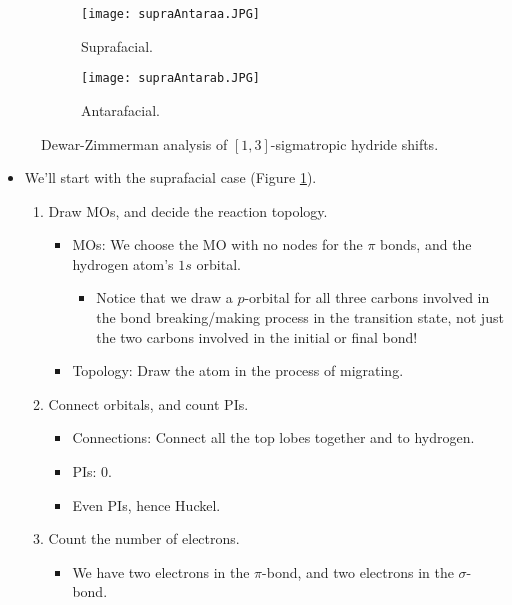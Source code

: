 \documentclass[../notes.tex]{subfiles}
\begin{document}
\begin{itemize}
\begin{figure}[h!]
\begin{subfigure}[b]{0.41\linewidth}
            \centering
            \texttt{[image: supraAntaraa.JPG]}
            \caption{Suprafacial.}
            \label{fig:supraAntaraa}
        \end{subfigure}
        \begin{subfigure}[b]{0.35\linewidth}
            \centering
            \texttt{[image: supraAntarab.JPG]}
            \caption{Antarafacial.}
            \label{fig:supraAntarab}
        \end{subfigure}
        \caption{Dewar-Zimmerman analysis of $[1,3]$-sigmatropic hydride shifts.}
        \label{fig:supraAntara}
    \end{figure}
    \begin{itemize}
        \item We'll start with the suprafacial case (Figure \ref{fig:supraAntaraa}).
        \begin{enumerate}
            \item Draw MOs, and decide the reaction topology.
            \begin{itemize}
                \item MOs: We choose the MO with no nodes for the $\pi$ bonds, and the hydrogen atom's $1s$ orbital.
                \begin{itemize}
                    \item Notice that we draw a $p$-orbital for all three carbons involved in the bond breaking/making process in the transition state, not just the two carbons involved in the initial or final bond!
                \end{itemize}
                \item Topology: Draw the  atom in the process of migrating.
            \end{itemize}
            \item Connect orbitals, and count PIs.
            \begin{itemize}
                \item Connections: Connect all the top lobes together and to hydrogen.
                \item PIs: 0.
                \item Even PIs, hence Huckel.
            \end{itemize}
            \item Count the number of electrons.
            \begin{itemize}
                \item We have two electrons in the  $\pi$-bond, and two electrons in the  $\sigma$-bond.

\end{itemize}
\end{enumerate}
\end{itemize}
\end{itemize}
\end{document}
